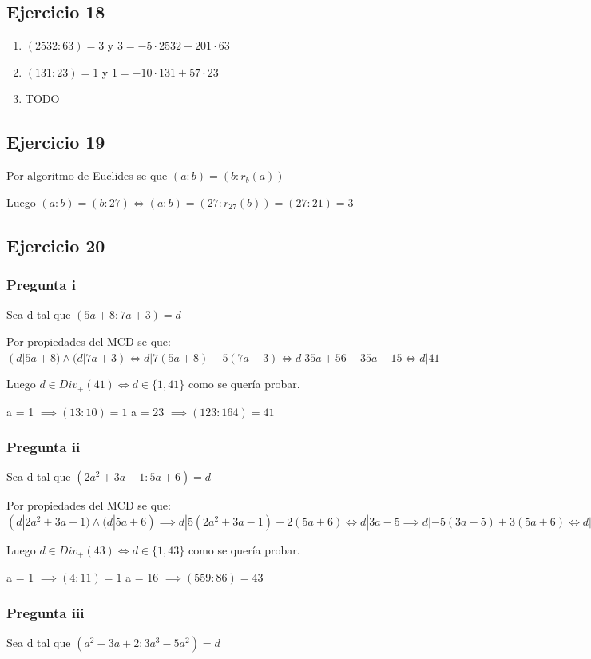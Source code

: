 \subsection{Ejercicio 18}
\begin{enumerate}
    \item $ (2532:63) = 3 $ y $ 3 = -5 \cdot 2532 + 201 \cdot 63$
    \item $ (131:23) = 1 $ y $ 1 = -10 \cdot 131 + 57 \cdot 23$
    \item TODO
\end{enumerate}

\subsection{Ejercicio 19}
Por algoritmo de Euclides se que $ (a:b) = (b:r_b(a)) $ 

Luego $(a:b) = (b:27) \iff (a:b) = (27:r_{27}(b)) = (27:21) = 3$

\subsection{Ejercicio 20}
\subsubsection{Pregunta i}
Sea d tal que $ (5a+8:7a+3) = d $

Por propiedades del MCD se que: $ (d|5a+8) \wedge (d|7a+3) \iff d|7(5a+8) - 5(7a+3) \iff d|35a+56-35a-15 \iff d|41$

Luego $ d \in Div_+(41) \iff d \in \{ 1,41 \} $ como se quería probar.

a = 1 $ \implies (13:10) = 1 $
a = 23 $ \implies (123:164) = 41 $

\subsubsection{Pregunta ii}
Sea d tal que $ (2a^2+3a-1:5a+6) = d $

Por propiedades del MCD se que: $ (d|2a^2+3a-1) \wedge (d|5a+6) \implies d|5(2a^2+3a-1) - 2(5a+6) \iff d|3a-5 \implies d|-5(3a-5)+3(5a+6)
\iff d|-15a+25+15a+18 \iff d|43 $


Luego $ d\in Div_+(43) \iff d \in \{ 1,43 \} $ como se quería probar.

a = 1 $ \implies (4:11) = 1 $
a = 16 $ \implies (559:86) = 43 $

\subsubsection{Pregunta iii}
Sea d tal que $ (a^2-3a+2:3a^3-5a^2) = d $

